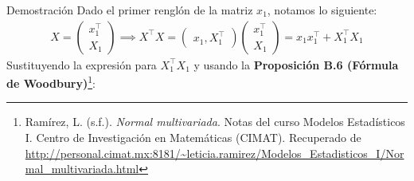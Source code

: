\documentclass[a4paper,11pt]{article}
\begin{document}
\begin{demostracion}{Demostración}
Dado el primer renglón de la matriz $x_1$, notamos  lo siguiente:
\begin{align*}
    X=\begin{pmatrix}
        x_1^\top\\
        X_1
    \end{pmatrix}\implies X^\top X=\begin{pmatrix}
        x_1,X_1^\top
    \end{pmatrix}\begin{pmatrix}
        x_1^\top\\
        X_1
    \end{pmatrix}=x_1x_1^\top +X_1^\top X_1
\end{align*}
Sustituyendo la expresión para $X_{1} ^\top X_1$ y usando la \textbf{Proposición B.6 (Fórmula de Woodbury)}\footnote{Ramírez, L. (s.f.). \textit{Normal multivariada}. Notas del curso Modelos Estadísticos I. Centro de Investigación en Matemáticas (CIMAT). Recuperado de \url{http://personal.cimat.mx:8181/~leticia.ramirez/Modelos_Estadisticos_I/Normal_multivariada.html}}:


\end{demostracion}
\end{document}
